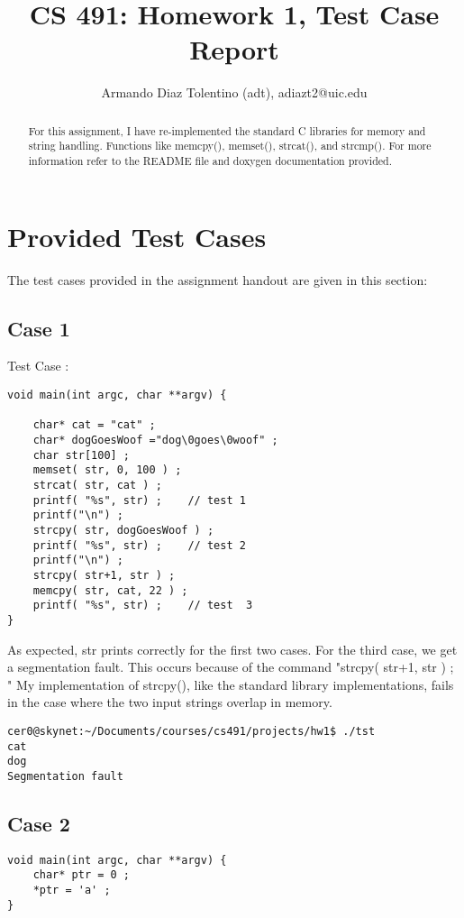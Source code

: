 \documentclass[onecolumn]{article}
\begin{document}
\title{CS 491: Homework 1, Test Case Report}
\author{Armando Diaz Tolentino (adt), adiazt2@uic.edu }
\maketitle

\begin{abstract}
For this assignment, I have re-implemented the standard C libraries for memory and string handling. 
Functions like memcpy(), memset(), strcat(), and strcmp(). For more information
refer to the README file and doxygen documentation provided.
\end{abstract}

\section{Provided Test Cases}
The test cases provided in the assignment handout are given in this section:
\subsection{Case 1}
Test Case :
\begin{verbatim}
void main(int argc, char **argv) {

	char* cat = "cat" ;
	char* dogGoesWoof ="dog\0goes\0woof" ;
	char str[100] ;
	memset( str, 0, 100 ) ;
	strcat( str, cat ) ;
	printf( "%s", str) ;	// test 1
	printf("\n") ;
	strcpy( str, dogGoesWoof ) ;
	printf( "%s", str) ;	// test 2
	printf("\n") ;
	strcpy( str+1, str ) ;
	memcpy( str, cat, 22 ) ;
	printf( "%s", str) ;	// test  3
}
\end{verbatim}


As expected, str prints correctly for the first two cases.
For the third case, we get a segmentation fault. This
occurs because of the command 
"strcpy( str+1, str ) ; "
My implementation of strcpy(), like the standard library 
implementations, fails in the case where the two input
strings overlap in memory.
\begin{verbatim}
cer0@skynet:~/Documents/courses/cs491/projects/hw1$ ./tst
cat
dog
Segmentation fault
\end{verbatim}

\subsection{Case 2}
\begin{verbatim}
void main(int argc, char **argv) {
	char* ptr = 0 ;
	*ptr = 'a' ;
}
\end{verbatim}
\end{document}
